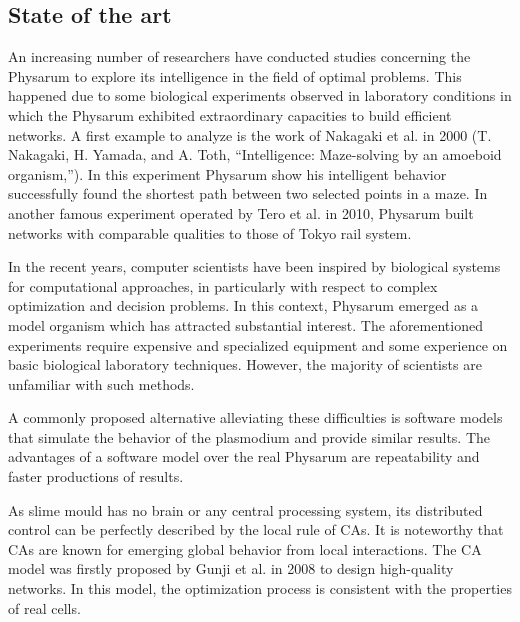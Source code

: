\subsection{State of the art}
An increasing number of researchers have conducted studies concerning the Physarum to explore its intelligence in the field of optimal problems. This happened due to some biological experiments observed in laboratory conditions in which the Physarum exhibited extraordinary capacities to build efficient networks.
A first example to analyze is the work of Nakagaki et al. in 2000 (T. Nakagaki, H. Yamada, and A. Toth, “Intelligence: Maze-solving by an amoeboid organism,”). In this experiment Physarum show his intelligent behavior successfully found the shortest path between two selected points in a maze. In another famous experiment\cite{Tero439} operated by Tero et al. in 2010, Physarum built networks with comparable qualities to those of Tokyo rail system.
\par
In the recent years, computer scientists have been inspired by biological systems for computational approaches, in particularly with respect to complex optimization and decision problems\cite{Grube2016PhysarumQV}. In this context, Physarum emerged as a model organism which has attracted substantial interest.  The aforementioned experiments require expensive and specialized equipment and some experience on basic biological laboratory techniques. However, the majority of scientists are unfamiliar with such methods. 
\par
A commonly proposed alternative alleviating these difficulties is software models that simulate the behavior of the plasmodium and provide similar results. The advantages of a software model over the real Physarum are repeatability and faster productions of results.
\par
As slime mould has no brain or any central processing system, its distributed control can be perfectly described by the local rule of CAs. It is noteworthy that CAs are known for emerging global behavior from local interactions. The CA model was firstly proposed by Gunji et al. in 2008 to design high-quality networks. In this model, the optimization process is consistent with the properties of real cells. 